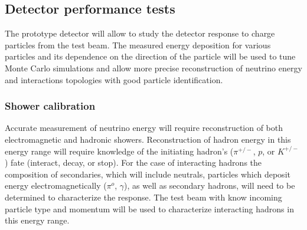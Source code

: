 
\subsection{Detector performance tests}

The prototype detector will allow to study the detector response to charge particles from the test beam. The measured energy deposition for various particles and its dependence on the direction of the particle will be used to tune
Monte Carlo simulations and allow more precise reconstruction of neutrino energy and interactions topologies with good particle identification.


\subsubsection{Shower calibration}

Accurate measurement of neutrino energy will require reconstruction of both electromagnetic and hadronic showers. Reconstruction of hadron energy 
in this energy range will require knowledge of the initiating hadron's 
($\pi^{+/-}$, $p$, or $K^{+/-}$)
fate (interact, decay, or stop). For the case of  interacting hadrons 
the composition of secondaries, which will include neutrals, particles which 
deposit energy electromagnetically ($\pi^o$, $\gamma$), as well as 
secondary hadrons,
will need to be determined to characterize the response. 
The test beam with know incoming particle type and momentum will be used
to characterize interacting hadrons in this energy range.

